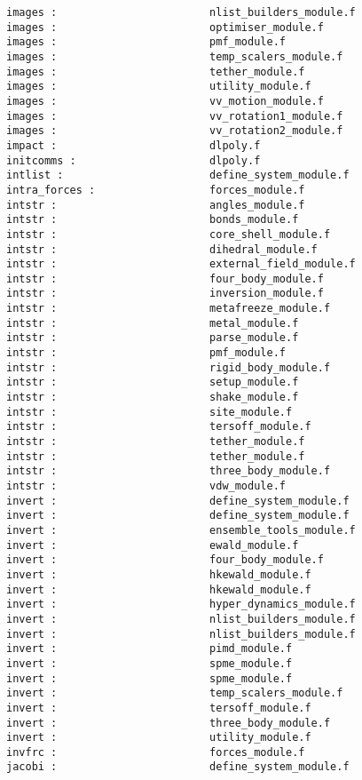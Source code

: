 \begin{verbatim}
images :                        nlist_builders_module.f
images :                        optimiser_module.f
images :                        pmf_module.f
images :                        temp_scalers_module.f
images :                        tether_module.f
images :                        utility_module.f
images :                        vv_motion_module.f
images :                        vv_rotation1_module.f
images :                        vv_rotation2_module.f
impact :                        dlpoly.f
initcomms :                     dlpoly.f
intlist :                       define_system_module.f
intra_forces :                  forces_module.f
intstr :                        angles_module.f 
intstr :                        bonds_module.f 
intstr :                        core_shell_module.f 
intstr :                        dihedral_module.f 
intstr :                        external_field_module.f 
intstr :                        four_body_module.f 
intstr :                        inversion_module.f 
intstr :                        metafreeze_module.f 
intstr :                        metal_module.f 
intstr :                        parse_module.f 
intstr :                        pmf_module.f 
intstr :                        rigid_body_module.f 
intstr :                        setup_module.f 
intstr :                        shake_module.f 
intstr :                        site_module.f 
intstr :                        tersoff_module.f 
intstr :                        tether_module.f 
intstr :                        tether_module.f 
intstr :                        three_body_module.f 
intstr :                        vdw_module.f 
invert :                        define_system_module.f
invert :                        define_system_module.f
invert :                        ensemble_tools_module.f
invert :                        ewald_module.f
invert :                        four_body_module.f
invert :                        hkewald_module.f
invert :                        hkewald_module.f
invert :                        hyper_dynamics_module.f
invert :                        nlist_builders_module.f
invert :                        nlist_builders_module.f
invert :                        pimd_module.f
invert :                        spme_module.f
invert :                        spme_module.f
invert :                        temp_scalers_module.f
invert :                        tersoff_module.f
invert :                        three_body_module.f
invert :                        utility_module.f
invfrc :                        forces_module.f
jacobi :                        define_system_module.f

\end{verbatim}
